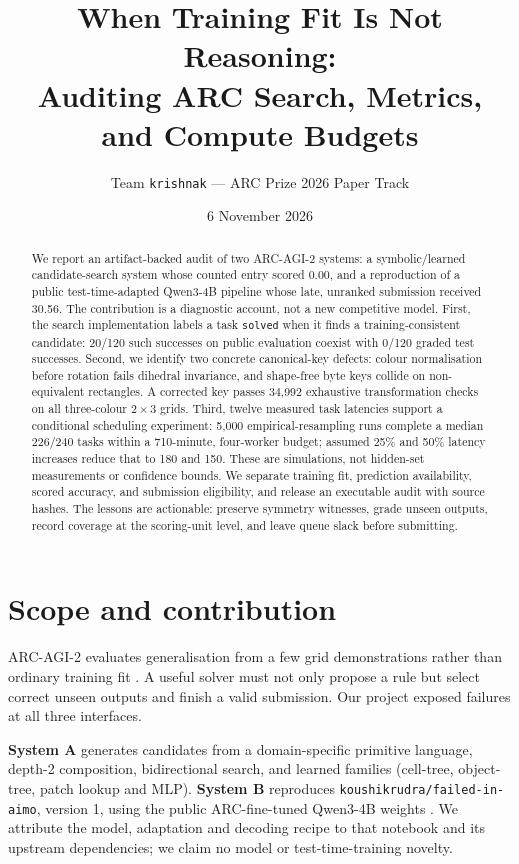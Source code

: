 \documentclass[10pt,a4paper]{article}
\title{\textbf{When Training Fit Is Not Reasoning:\\Auditing ARC Search, Metrics, and Compute Budgets}}
\author{Team \texttt{krishnak} --- ARC Prize 2026 Paper Track}
\date{6 November 2026}
\begin{document}
\maketitle
\begin{abstract}
We report an artifact-backed audit of two ARC-AGI-2 systems: a symbolic/learned candidate-search system whose counted entry scored 0.00, and a reproduction of a public test-time-adapted Qwen3-4B pipeline whose late, unranked submission received 30.56. The contribution is a diagnostic account, not a new competitive model. First, the search implementation labels a task \texttt{solved} when it finds a training-consistent candidate: 20/120 such successes on public evaluation coexist with 0/120 graded test successes. Second, we identify two concrete canonical-key defects: colour normalisation before rotation fails dihedral invariance, and shape-free byte keys collide on non-equivalent rectangles. A corrected key passes 34,992 exhaustive transformation checks on all three-colour $2\times3$ grids. Third, twelve measured task latencies support a conditional scheduling experiment: 5,000 empirical-resampling runs complete a median 226/240 tasks within a 710-minute, four-worker budget; assumed 25\% and 50\% latency increases reduce that to 180 and 150. These are simulations, not hidden-set measurements or confidence bounds. We separate training fit, prediction availability, scored accuracy, and submission eligibility, and release an executable audit with source hashes. The lessons are actionable: preserve symmetry witnesses, grade unseen outputs, record coverage at the scoring-unit level, and leave queue slack before submitting.
\end{abstract}

\section{Scope and contribution}
ARC-AGI-2 evaluates generalisation from a few grid demonstrations rather than ordinary training fit \cite{arcagi2}. A useful solver must not only propose a rule but select correct unseen outputs and finish a valid submission. Our project exposed failures at all three interfaces.

\textbf{System A} generates candidates from a domain-specific primitive language, depth-2 composition, bidirectional search, and learned families (cell-tree, object-tree, patch lookup and MLP). \textbf{System B} reproduces \texttt{koushikrudra/failed-in-aimo}, version 1, using the public ARC-fine-tuned Qwen3-4B weights \cite{source,model}. We attribute the model, adaptation and decoding recipe to that notebook and its upstream dependencies; we claim no model or test-time-training novelty.
\end{document}
